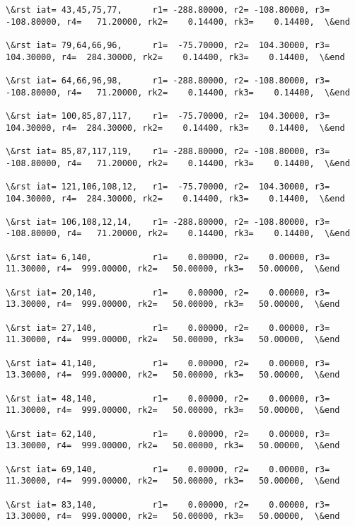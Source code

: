 \documentclass[11pt]{article}
\begin{document}
\begin{Verbatim}[commandchars=\\\{\}]
\&rst iat= 43,45,75,77,      r1= -288.80000, r2= -108.80000, r3= -108.80000, r4=   71.20000, rk2=    0.14400, rk3=    0.14400,  \&end

\&rst iat= 79,64,66,96,      r1=  -75.70000, r2=  104.30000, r3=  104.30000, r4=  284.30000, rk2=    0.14400, rk3=    0.14400,  \&end

\&rst iat= 64,66,96,98,      r1= -288.80000, r2= -108.80000, r3= -108.80000, r4=   71.20000, rk2=    0.14400, rk3=    0.14400,  \&end

\&rst iat= 100,85,87,117,    r1=  -75.70000, r2=  104.30000, r3=  104.30000, r4=  284.30000, rk2=    0.14400, rk3=    0.14400,  \&end

\&rst iat= 85,87,117,119,    r1= -288.80000, r2= -108.80000, r3= -108.80000, r4=   71.20000, rk2=    0.14400, rk3=    0.14400,  \&end

\&rst iat= 121,106,108,12,   r1=  -75.70000, r2=  104.30000, r3=  104.30000, r4=  284.30000, rk2=    0.14400, rk3=    0.14400,  \&end

\&rst iat= 106,108,12,14,    r1= -288.80000, r2= -108.80000, r3= -108.80000, r4=   71.20000, rk2=    0.14400, rk3=    0.14400,  \&end

\&rst iat= 6,140,            r1=    0.00000, r2=    0.00000, r3=   11.30000, r4=  999.00000, rk2=   50.00000, rk3=   50.00000,  \&end

\&rst iat= 20,140,           r1=    0.00000, r2=    0.00000, r3=   13.30000, r4=  999.00000, rk2=   50.00000, rk3=   50.00000,  \&end

\&rst iat= 27,140,           r1=    0.00000, r2=    0.00000, r3=   11.30000, r4=  999.00000, rk2=   50.00000, rk3=   50.00000,  \&end

\&rst iat= 41,140,           r1=    0.00000, r2=    0.00000, r3=   13.30000, r4=  999.00000, rk2=   50.00000, rk3=   50.00000,  \&end

\&rst iat= 48,140,           r1=    0.00000, r2=    0.00000, r3=   11.30000, r4=  999.00000, rk2=   50.00000, rk3=   50.00000,  \&end

\&rst iat= 62,140,           r1=    0.00000, r2=    0.00000, r3=   13.30000, r4=  999.00000, rk2=   50.00000, rk3=   50.00000,  \&end

\&rst iat= 69,140,           r1=    0.00000, r2=    0.00000, r3=   11.30000, r4=  999.00000, rk2=   50.00000, rk3=   50.00000,  \&end

\&rst iat= 83,140,           r1=    0.00000, r2=    0.00000, r3=   13.30000, r4=  999.00000, rk2=   50.00000, rk3=   50.00000,  \&end


\end{Verbatim}
\end{document}
